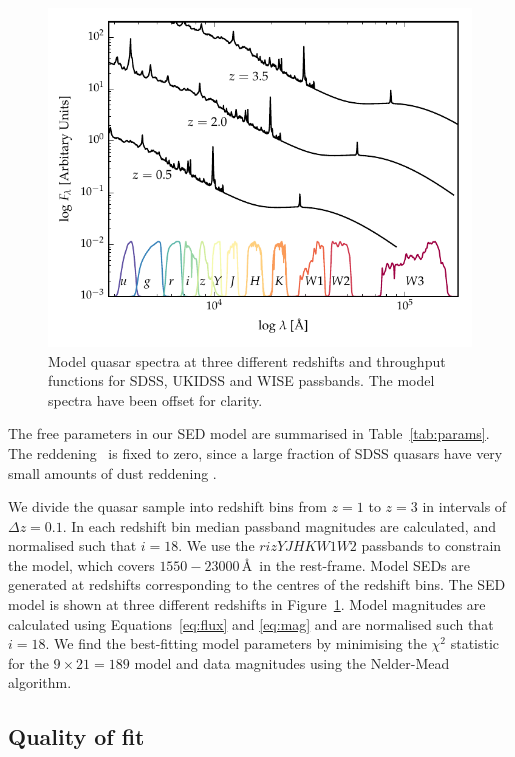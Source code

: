 \begin{figure}
  \centering
  \includegraphics[width=\textwidth]{figures/chapter05/throughput.pdf}
  \caption[{Model quasar spectrum at three different redshifts.}]{Model quasar spectra at three different redshifts and throughput functions for SDSS, UKIDSS and WISE passbands. The model spectra have been offset for clarity.}
  \label{fig:filters}
\end{figure}

The free parameters in our SED model are summarised in Table~\ref{tab:params}. 
The reddening \ebv\, is fixed to zero, since a large fraction of SDSS quasars have very small amounts of dust reddening \citep{richards03}. 

We divide the quasar sample into redshift bins from $z=1$ to $z=3$ in intervals of $\Delta z = 0.1$.
In each redshift bin median passband magnitudes are calculated, and normalised such that $i=18$.
We use the $rizYJHKW1W2$ passbands to constrain the model, which covers $1550-23000$\,\AA\, in the rest-frame. 
Model SEDs are generated at redshifts corresponding to the centres of the redshift bins.
The SED model is shown at three different redshifts in Figure~\ref{fig:filters}.
Model magnitudes are calculated using Equations~\ref{eq:flux} and \ref{eq:mag} and are normalised such that $i=18$.
We find the best-fitting model parameters by minimising the $\chi^2$ statistic for the $9 \times 21 = 189$ model and data magnitudes using the Nelder-Mead algorithm. 

\subsection{Quality of fit}

